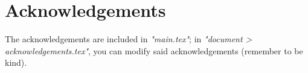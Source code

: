 \section{Acknowledgements}
The acknowledgements are included in \textit{"main.tex"}; in \textit{"document > acknowledgements.tex"}, you can modify said acknowledgements (remember to be kind).